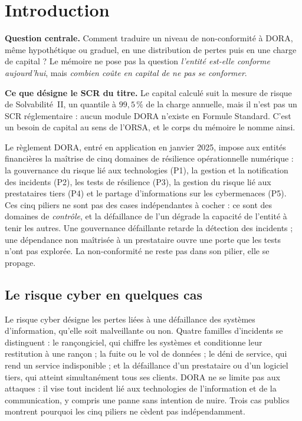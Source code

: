 \chapter{Introduction}

\begin{cle}
\textbf{Question centrale.} Comment traduire un niveau de non-conformité à DORA, même
hypothétique ou graduel, en une distribution de pertes puis en une charge de capital ? Le
mémoire ne pose pas la question \emph{l'entité est-elle conforme aujourd'hui}, mais
\emph{combien coûte en capital de ne pas se conformer}.

\textbf{Ce que désigne le SCR du titre.} Le capital calculé suit la mesure de risque de
Solvabilité~II, un quantile à $99{,}5\,\%$ de la charge annuelle, mais il n'est pas un SCR
réglementaire : aucun module DORA n'existe en Formule Standard. C'est un besoin de capital au
sens de l'ORSA, et le corps du mémoire le nomme ainsi.
\end{cle}

Le règlement DORA, entré en application en janvier 2025, impose aux entités financières la
maîtrise de cinq domaines de résilience opérationnelle numérique : la gouvernance du risque
lié aux technologies (P1), la gestion et la notification des incidents (P2), les tests de
résilience (P3), la gestion du risque lié aux prestataires tiers (P4) et le partage
d'informations sur les cybermenaces (P5). Ces cinq piliers ne sont pas des cases
indépendantes à cocher : ce sont des domaines de \emph{contrôle}, et la défaillance de l'un
dégrade la capacité de l'entité à tenir les autres. Une gouvernance défaillante retarde la
détection des incidents ; une dépendance non maîtrisée à un prestataire ouvre une porte que
les tests n'ont pas explorée. La non-conformité ne reste pas dans son pilier, elle se
propage.


\section{Le risque cyber en quelques cas}

Le risque cyber désigne les pertes liées à une défaillance des systèmes d'information, qu'elle
soit malveillante ou non. Quatre familles d'incidents se distinguent : le rançongiciel, qui
chiffre les systèmes et conditionne leur restitution à une rançon ; la fuite ou le vol de
données ; le déni de service, qui rend un service indisponible ; et la défaillance d'un
prestataire ou d'un logiciel tiers, qui atteint simultanément tous ses clients. DORA ne se limite
pas aux attaques : il vise tout incident lié aux technologies de l'information et de la
communication, y compris une panne sans intention de nuire. Trois cas publics montrent pourquoi
les cinq piliers ne cèdent pas indépendamment.

